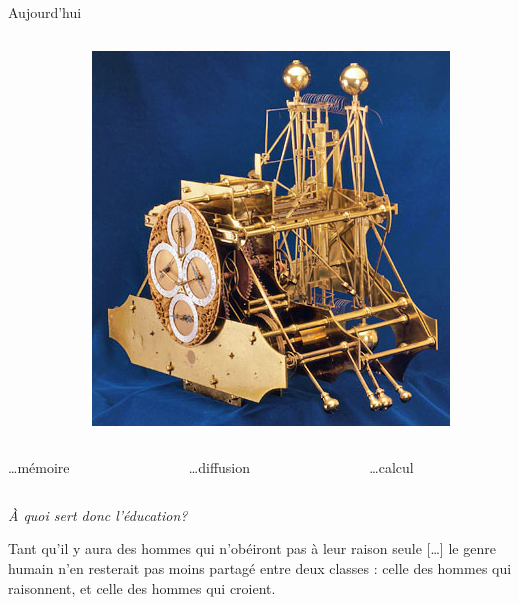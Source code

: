 \begin{frame}{Aujourd'hui}
\begin{columns}
\begin{column}{0.33\linewidth}
\end{column}
\begin{column}{0.33\linewidth}
\centering
\includegraphics[height=0.35\paperheight]{../resources/illustrations/harrison} \\
\end{column}
\end{columns}

\vfill

\begin{columns}
\begin{column}{0.33\linewidth}
\centering
\ldots mémoire
\end{column}
\begin{column}{0.33\linewidth}
\centering
\ldots diffusion
\end{column}
\begin{column}{0.33\linewidth}
\centering
\ldots calcul
\end{column}
\end{columns}
\end{frame}
\begin{frame}
\vfill
\Huge 
\begin{center}
\emph{À quoi sert donc l'éducation?}
\end{center}
\vfill
\end{frame}

\begin{frame}
\vfill
\centering
\large
\begin{coolquote}
Tant qu'il y aura des hommes qui n'obéiront pas à leur raison seule [\ldots] le genre humain n'en resterait pas moins partagé entre deux classes : celle des hommes qui raisonnent, et celle 
des hommes qui croient.
\end{coolquote}
\vfill
\end{frame}

